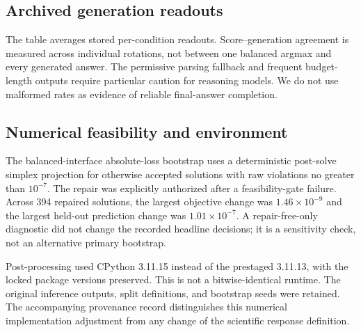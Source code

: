 \subsection{Archived generation readouts}

The table averages stored per-condition readouts. Score--generation agreement is measured across individual rotations, not between one balanced argmax and every generated answer. The permissive parsing fallback and frequent budget-length outputs require particular caution for reasoning models. We do not use malformed rates as evidence of reliable final-answer completion.

\subsection{Numerical feasibility and environment}
The balanced-interface absolute-loss bootstrap uses a deterministic post-solve simplex projection for otherwise accepted solutions with raw violations no greater than $10^{-7}$. The repair was explicitly authorized after a feasibility-gate failure. Across 394 repaired solutions, the largest objective change was $1.46\times10^{-9}$ and the largest held-out prediction change was $1.01\times10^{-7}$. A repair-free-only diagnostic did not change the recorded headline decisions; it is a sensitivity check, not an alternative primary bootstrap.

Post-processing used CPython 3.11.15 instead of the prestaged 3.11.13, with the locked package versions preserved. This is not a bitwise-identical runtime. The original inference outputs, split definitions, and bootstrap seeds were retained. The accompanying provenance record distinguishes this numerical implementation adjustment from any change of the scientific response definition.
